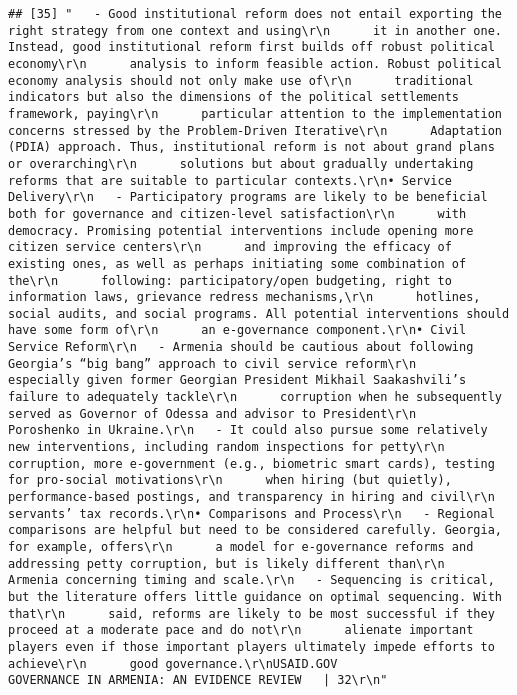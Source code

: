 \documentclass[
]{article}
\begin{document}
\begin{verbatim}
## [35] "   - Good institutional reform does not entail exporting the right strategy from one context and using\r\n      it in another one. Instead, good institutional reform first builds off robust political economy\r\n      analysis to inform feasible action. Robust political economy analysis should not only make use of\r\n      traditional indicators but also the dimensions of the political settlements framework, paying\r\n      particular attention to the implementation concerns stressed by the Problem-Driven Iterative\r\n      Adaptation (PDIA) approach. Thus, institutional reform is not about grand plans or overarching\r\n      solutions but about gradually undertaking reforms that are suitable to particular contexts.\r\n• Service Delivery\r\n   - Participatory programs are likely to be beneficial both for governance and citizen-level satisfaction\r\n      with democracy. Promising potential interventions include opening more citizen service centers\r\n      and improving the efficacy of existing ones, as well as perhaps initiating some combination of the\r\n      following: participatory/open budgeting, right to information laws, grievance redress mechanisms,\r\n      hotlines, social audits, and social programs. All potential interventions should have some form of\r\n      an e-governance component.\r\n• Civil Service Reform\r\n   - Armenia should be cautious about following Georgia’s “big bang” approach to civil service reform\r\n      especially given former Georgian President Mikhail Saakashvili’s failure to adequately tackle\r\n      corruption when he subsequently served as Governor of Odessa and advisor to President\r\n      Poroshenko in Ukraine.\r\n   - It could also pursue some relatively new interventions, including random inspections for petty\r\n      corruption, more e-government (e.g., biometric smart cards), testing for pro-social motivations\r\n      when hiring (but quietly), performance-based postings, and transparency in hiring and civil\r\n      servants’ tax records.\r\n• Comparisons and Process\r\n   - Regional comparisons are helpful but need to be considered carefully. Georgia, for example, offers\r\n      a model for e-governance reforms and addressing petty corruption, but is likely different than\r\n      Armenia concerning timing and scale.\r\n   - Sequencing is critical, but the literature offers little guidance on optimal sequencing. With that\r\n      said, reforms are likely to be most successful if they proceed at a moderate pace and do not\r\n      alienate important players even if those important players ultimately impede efforts to achieve\r\n      good governance.\r\nUSAID.GOV                                                   GOVERNANCE IN ARMENIA: AN EVIDENCE REVIEW   | 32\r\n"                                                                                                                                                                                                                                                                                                                                                                                                                                                                                                                                                                  
\end{verbatim}
\end{document}
